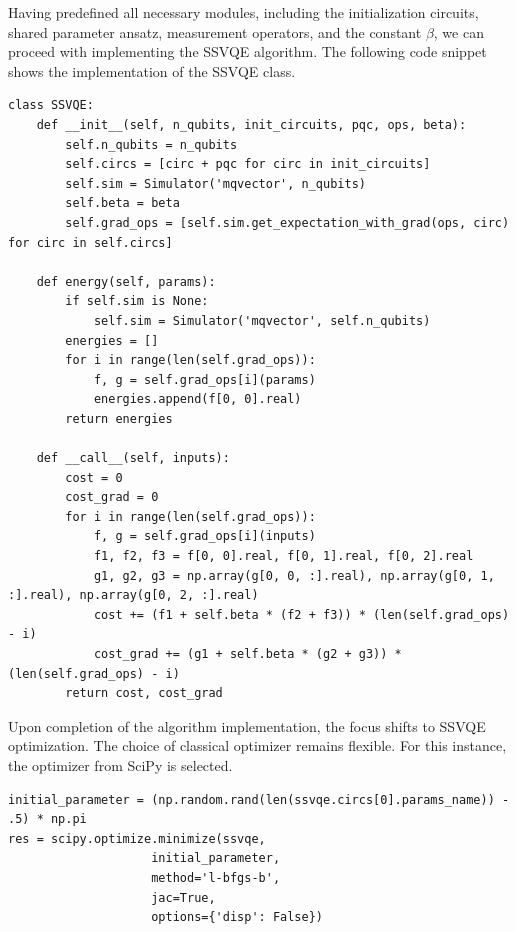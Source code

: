 Having predefined all necessary modules, including the initialization circuits, shared parameter ansatz, measurement operators, and the constant $\beta$, we can proceed with implementing the SSVQE algorithm. The following code snippet shows the implementation of the SSVQE class.
\begin{lstlisting}
class SSVQE:
    def __init__(self, n_qubits, init_circuits, pqc, ops, beta):
        self.n_qubits = n_qubits
        self.circs = [circ + pqc for circ in init_circuits]
        self.sim = Simulator('mqvector', n_qubits)
        self.beta = beta
        self.grad_ops = [self.sim.get_expectation_with_grad(ops, circ) for circ in self.circs]

    def energy(self, params):
        if self.sim is None:
            self.sim = Simulator('mqvector', self.n_qubits)
        energies = []
        for i in range(len(self.grad_ops)):
            f, g = self.grad_ops[i](params)
            energies.append(f[0, 0].real)
        return energies

    def __call__(self, inputs):
        cost = 0
        cost_grad = 0
        for i in range(len(self.grad_ops)):
            f, g = self.grad_ops[i](inputs)
            f1, f2, f3 = f[0, 0].real, f[0, 1].real, f[0, 2].real
            g1, g2, g3 = np.array(g[0, 0, :].real), np.array(g[0, 1, :].real), np.array(g[0, 2, :].real)
            cost += (f1 + self.beta * (f2 + f3)) * (len(self.grad_ops) - i)
            cost_grad += (g1 + self.beta * (g2 + g3)) * (len(self.grad_ops) - i)
        return cost, cost_grad
\end{lstlisting}


Upon completion of the algorithm implementation, the focus shifts to SSVQE optimization. The choice of classical optimizer remains flexible. For this instance, the  optimizer from SciPy is selected.


\begin{lstlisting}
initial_parameter = (np.random.rand(len(ssvqe.circs[0].params_name)) - .5) * np.pi
res = scipy.optimize.minimize(ssvqe,
                    initial_parameter,
                    method='l-bfgs-b',
                    jac=True,
                    options={'disp': False})
\end{lstlisting}

